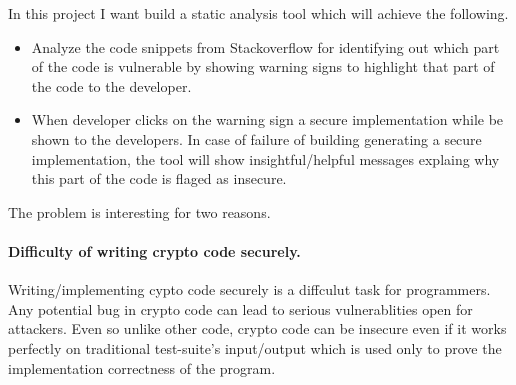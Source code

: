    \label{into}
   
   In this project I want build a static analysis tool which will achieve the following. 
   \begin{itemize}
   \item  Analyze the code snippets from Stackoverflow for identifying out which part of the code is vulnerable by showing warning signs to highlight that part of the code to the developer.
   \item When developer clicks on the warning sign a secure implementation while be shown to the developers. In case of failure of building generating a secure implementation, the tool will show insightful/helpful messages explaing why this part of the code is flaged as insecure.  
   \end{itemize}
   
   The problem is interesting for two reasons. 
   
   \paragraph{Difficulty of writing crypto code securely.} Writing/implementing cypto code securely is a diffculut task for programmers. Any potential bug in crypto code can lead to serious vulnerablities open for attackers.
   Even so unlike other code, crypto code can be insecure even if it works 
   perfectly on traditional test-suite's input/output which is used only to prove the implementation correctness of the program.
   
